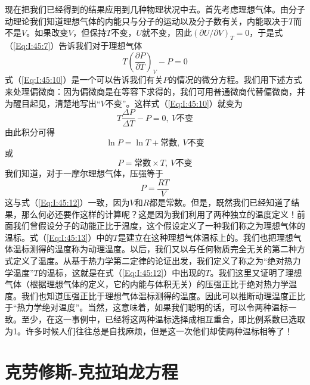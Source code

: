 现在把我们已经得到的结果应用到几种物理状况中去。首先考虑理想气体。由分子动理论我们知道理想气体的内能只与分子的运动以及分子数有关，内能取决于$T$而不是$V$。如果改变$V$，但保持$T$不变，$U$就不变，因此$(\partial U /\partial V)_T =0$，于是式（\ref{Eq:I:45:7}）告诉我们对于理想气体
\begin{equation}
    \label{Eq:I:45:10}
    T\left(\frac{\partial P}{\partial T}\right)_V - P = 0
\end{equation}
式（\ref{Eq:I:45:10}）是一个可以告诉我们有关$P$的情况的微分方程。我们用下述方式来处理偏微商：因为偏微商是在等容下求得的，我们可用普通微商代替偏微商，并为醒目起见，清楚地写出“$V$不变”。这样式（\ref{Eq:I:45:10}）就变为
\begin{equation}
    \label{Eq:I:45:11}
    T\frac{\Delta P}{\Delta T} - P = 0,~V\text{不变}
\end{equation}
由此积分可得
\begin{equation*}
    \ln P = \ln T + \text{常数},~V\text{不变}
\end{equation*}
或
\begin{equation}
    \label{Eq:I:45:12}
    P=\text{常数}\times T,~V\text{不变}
\end{equation}
我们知道，对于一摩尔理想气体，压强等于
\begin{equation}
    \label{Eq:I:45:13}
    P = \frac{RT}{V}
\end{equation}
这与式（\ref{Eq:I:45:12}）一致，因为$V$和$R$都是常数。但是，既然我们已经知道了结果，那么何必还要作这样的计算呢？这是因为我们利用了两种独立的温度定义！前面我们曾假设分子的动能正比于温度，这个假设定义了一种我们称之为理想气体的温标。式（\ref{Eq:I:45:13}）中的$T$是建立在这种理想气体温标上的。我们也把理想气体温标测得的温度称为动理温度。以后，我们又以与任何物质完全无关的第二种方式定义了温度。从基于热力学第二定律的论证出发，我们定义了称之为“绝对热力学温度”$T$的温标，这就是在式（\ref{Eq:I:45:12}）中出现的$T$。我们这里又证明了理想气体（根据理想气体的定义，它的内能与体积无关）的压强正比于绝对热力学温度。我们也知道压强正比于理想气体温标测得的温度。因此可以推断动理温度正比于“热力学绝对温度”。当然，这意味着，如果我们聪明的话，可以令两种温标一致。至少，在这一事例中，已经将这两种温标选择成相互重合，即比例系数已选取为1。许多时候人们往往总是自找麻烦，但是这一次他们却使两种温标相等了！

\section{克劳修斯-克拉珀龙方程}

